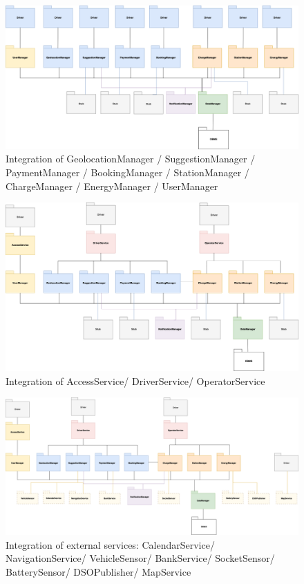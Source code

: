 \documentclass[../main.tex]{subfiles}
\begin{document}
\begin{figure}[H]
    \centering
    \begin{minipage}[b]{\textwidth}
        \centering
        \includegraphics[width=1.05\textwidth]{ImplementationDiagram/3.png}
        \caption{Integration of GeolocationManager / SuggestionManager / PaymentManager / BookingManager / StationManager / ChargeManager / EnergyManager / UserManager}
        \label{fig:impdiag}
    \end{minipage}
\end{figure}


\begin{figure}[H]
    \centering
    \includegraphics[width=1.05\textwidth]{ImplementationDiagram/4.png}
    \caption{Integration of AccessService/ DriverService/ OperatorService}
    \label{fig:impdiag}
\end{figure}

\begin{figure}[H]
    \centering
    \includegraphics[width=1.05\textwidth]{ImplementationDiagram/5.png}
    \caption{Integration of external services: CalendarService/ NavigationService/ VehicleSensor/ BankService/ SocketSensor/ BatterySensor/ DSOPublisher/ MapService}
    \label{fig:impdiag}
\end{figure}
\end{document}
